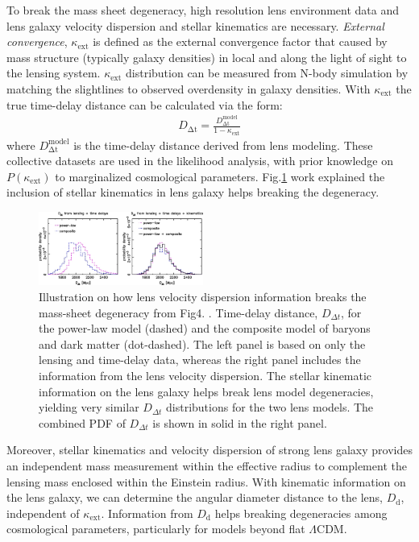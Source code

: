 \documentclass{cosmo}
\begin{document}
    To break the mass sheet degeneracy, high resolution lens environment data and lens galaxy velocity dispersion and stellar kinematics are necessary. \emph{External convergence}, $\kappa_\mathrm{ext}$ is defined as the external convergence factor that caused by mass structure (typically galaxy densities) in local and along the light of sight to the lensing system. $\kappa_\mathrm{ext}$ distribution can be measured from N-body simulation by matching the slightlines to observed overdensity in galaxy densities. With $\kappa_\mathrm{ext}$ the true time-delay distance can be calculated via the form:
    \begin{align*}
       D_\mathrm{\Delta t} = \frac{D^{\mathrm{model}}_\mathrm{\Delta t}}{1-\kappa_\mathrm{ext}}
    \end{align*}
    where $D^{\mathrm{model}}_\mathrm{\Delta t}$ is the time-delay distance derived from lens modeling. These collective datasets are used in the likelihood analysis, with prior knowledge on $P(\kappa_\mathrm{ext})$ to marginalized cosmological parameters. Fig.\ref{fig5} work explained the inclusion of stellar kinematics in lens galaxy helps breaking the degeneracy.
    \begin{figure}[h]
        \centering
        \includegraphics[width=0.48\textwidth]{fig5_2.png}
        \caption{Illustration on how lens velocity dispersion information breaks the mass-sheet degeneracy from Fig4. \cite{Suyu2014}. Time-delay distance, $D_{\Delta t}$, for the power-law model (dashed) and the composite model of baryons and dark matter (dot-dashed). The left panel is based on only the lensing and time-delay data, whereas the right panel includes the information from the lens velocity dispersion. The stellar kinematic information on the lens galaxy helps break lens model degeneracies, yielding very similar $D_{\Delta t}$ distributions for the two lens models. The combined PDF of $D_{\Delta t}$ is shown in solid in the right panel.}
        \label{fig5}
    \end{figure}
    Moreover, stellar kinematics and velocity dispersion of strong lens galaxy provides an independent mass measurement within the effective radius to complement the lensing mass enclosed within the Einstein radius. With kinematic information on the lens galaxy, we can determine the angular diameter distance to the
    lens, $D_\mathrm{d}$, independent of $\kappa_\mathrm{ext}$. Information from $D_\mathrm{d}$ helps breaking degeneracies
    among cosmological parameters, particularly for models beyond flat $\Lambda$CDM.
    
\end{document}
